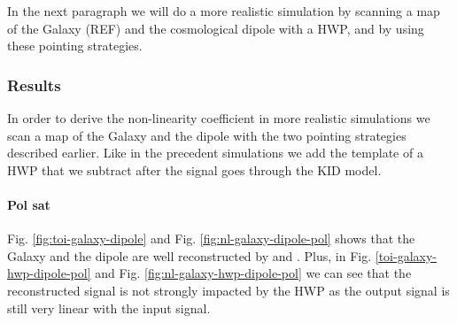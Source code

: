 In the next paragraph we will do a more realistic simulation by scanning a map of the Galaxy (REF) and the cosmological dipole with a HWP, and by using these pointing strategies. 

\subsubsection{Results}

In order to derive the non-linearity coefficient in more realistic simulations we scan a map of the Galaxy and the dipole with the two pointing strategies described earlier. Like in the precedent simulations we add the template of a HWP that we subtract after the signal goes through the KID model.

\paragraph{Pol sat \\}

%

Fig. \ref{fig:toi-galaxy-dipole} and  Fig. \ref{fig:nl-galaxy-dipole-pol} shows that the Galaxy and the dipole are well reconstructed by \rf and \cf. Plus, in Fig. \ref{toi-galaxy-hwp-dipole-pol} and Fig. \ref{fig:nl-galaxy-hwp-dipole-pol} we can see that the reconstructed signal is not strongly impacted by the HWP as the output signal is still very linear with the input signal.

